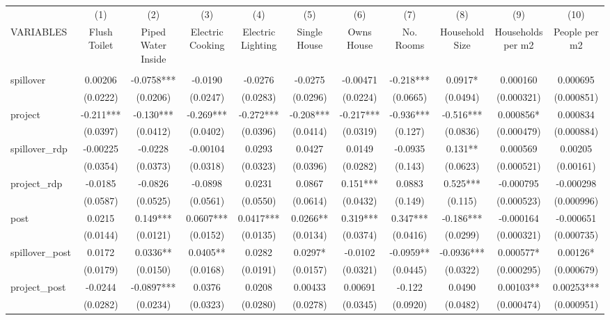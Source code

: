 
\begin{tabular}{lcccccccccc} \hline
 & (1) & (2) & (3) & (4) & (5) & (6) & (7) & (8) & (9) & (10) \\
VARIABLES & Flush Toilet & Piped Water Inside & Electric Cooking & Electric Lighting & Single House & Owns House & No. Rooms & Household Size & Households per m2 & People per m2 \\ \hline
 &  &  &  &  &  &  &  &  &  &  \\
spillover & 0.00206 & -0.0758*** & -0.0190 & -0.0276 & -0.0275 & -0.00471 & -0.218*** & 0.0917* & 0.000160 & 0.000695 \\
 & (0.0222) & (0.0206) & (0.0247) & (0.0283) & (0.0296) & (0.0224) & (0.0665) & (0.0494) & (0.000321) & (0.000851) \\
project & -0.211*** & -0.130*** & -0.269*** & -0.272*** & -0.208*** & -0.217*** & -0.936*** & -0.516*** & 0.000856* & 0.000834 \\
 & (0.0397) & (0.0412) & (0.0402) & (0.0396) & (0.0414) & (0.0319) & (0.127) & (0.0836) & (0.000479) & (0.000884) \\
spillover\_rdp & -0.00225 & -0.0228 & -0.00104 & 0.0293 & 0.0427 & 0.0149 & -0.0935 & 0.131** & 0.000569 & 0.00205 \\
 & (0.0354) & (0.0373) & (0.0318) & (0.0323) & (0.0396) & (0.0282) & (0.143) & (0.0623) & (0.000521) & (0.00161) \\
project\_rdp & -0.0185 & -0.0826 & -0.0898 & 0.0231 & 0.0867 & 0.151*** & 0.0883 & 0.525*** & -0.000795 & -0.000298 \\
 & (0.0587) & (0.0525) & (0.0561) & (0.0550) & (0.0614) & (0.0432) & (0.149) & (0.115) & (0.000523) & (0.000996) \\
post & 0.0215 & 0.149*** & 0.0607*** & 0.0417*** & 0.0266** & 0.319*** & 0.347*** & -0.186*** & -0.000164 & -0.000651 \\
 & (0.0144) & (0.0121) & (0.0152) & (0.0135) & (0.0134) & (0.0374) & (0.0416) & (0.0299) & (0.000321) & (0.000735) \\
spillover\_post & 0.0172 & 0.0336** & 0.0405** & 0.0282 & 0.0297* & -0.0102 & -0.0959** & -0.0936*** & 0.000577* & 0.00126* \\
 & (0.0179) & (0.0150) & (0.0168) & (0.0191) & (0.0157) & (0.0321) & (0.0445) & (0.0322) & (0.000295) & (0.000679) \\
project\_post & -0.0244 & -0.0897*** & 0.0376 & 0.0208 & 0.00433 & 0.00691 & -0.122 & 0.0490 & 0.00103** & 0.00253*** \\
 & (0.0282) & (0.0234) & (0.0323) & (0.0280) & (0.0278) & (0.0345) & (0.0920) & (0.0482) & (0.000474) & (0.000951) \\

\end{tabular}
